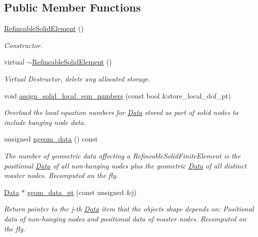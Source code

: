 \subsection*{Public Member Functions}
\begin{DoxyCompactItemize}
\item 
\hyperlink{classoomph_1_1RefineableSolidElement_a7e30a2a6c56a69a37ce327a2cfb69e40}{Refineable\+Solid\+Element} ()
\begin{DoxyCompactList}\small\item\em Constructor. \end{DoxyCompactList}\item 
virtual \hyperlink{classoomph_1_1RefineableSolidElement_a7bb075ed922e71ed102a02adfe2d24e7}{$\sim$\+Refineable\+Solid\+Element} ()
\begin{DoxyCompactList}\small\item\em Virtual Destructor, delete any allocated storage. \end{DoxyCompactList}\item 
void \hyperlink{classoomph_1_1RefineableSolidElement_a7718105cbc38cff969a246b093b6ecee}{assign\+\_\+solid\+\_\+local\+\_\+eqn\+\_\+numbers} (const bool \&store\+\_\+local\+\_\+dof\+\_\+pt)
\begin{DoxyCompactList}\small\item\em Overload the local equation numbers for \hyperlink{classoomph_1_1Data}{Data} stored as part of solid nodes to include hanging node data. \end{DoxyCompactList}\item 
unsigned \hyperlink{classoomph_1_1RefineableSolidElement_a690e24cdbd9308da1b9e705fd0340de8}{ngeom\+\_\+data} () const
\begin{DoxyCompactList}\small\item\em The number of geometric data affecting a Refineable\+Solid\+Finite\+Element is the positional \hyperlink{classoomph_1_1Data}{Data} of all non-\/hanging nodes plus the geometric \hyperlink{classoomph_1_1Data}{Data} of all distinct master nodes. Recomputed on the fly. \end{DoxyCompactList}\item 
\hyperlink{classoomph_1_1Data}{Data} $\ast$ \hyperlink{classoomph_1_1RefineableSolidElement_a3f20de56e3a920644b01dac184f67ef1}{geom\+\_\+data\+\_\+pt} (const unsigned \&j)
\begin{DoxyCompactList}\small\item\em Return pointer to the j-\/th \hyperlink{classoomph_1_1Data}{Data} item that the object\textquotesingle{}s shape depends on\+: Positional data of non-\/hanging nodes and positional data of master nodes. Recomputed on the fly. \end{DoxyCompactList}\item 

\end{DoxyCompactItemize}
